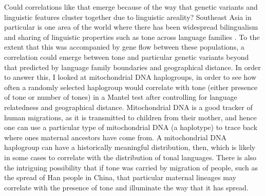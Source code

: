 \documentclass[output=paper]{langsci/langscibook}
\begin{document}
Could correlations like that emerge because of the way that genetic variants and linguistic features 
cluster together due to linguistic areality? Southeast Asia in particular is one area of the world where there has been widespread bilingualism and sharing of linguistic properties such as tone  
across language families \citep{EnfieldAreal2005}. To the extent that this was accompanied by gene flow
between these populations, a correlation could emerge between tone and particular genetic variants
beyond that predicted by language family boundaries and geographical distance. In order to answer
this, I looked at mitochondrial DNA haplogroups, in order to see how often a randomly selected
haplogroup would correlate with tone (either presence of tone or number of tones) in a Mantel test
after controlling for language relatedness and geographical distance. Mitochondrial DNA is a good
tracker of human migrations, as it is transmitted to children from their mother, and hence one can use a particular type of mitochondrial DNA (a haplotype) to trace back where ones maternal
ancestors have come from. A mitochondrial DNA haplogroup can have a historically meaningful
distribution, then, which is likely in some cases to correlate with the distribution of tonal
languages. There is also the intriguing possibility that if tone was carried by migration of people,
such as the spread of Han people in China, that particular maternal lineages may correlate with the
presence of tone and illuminate the way that it has spread.
\end{document}
